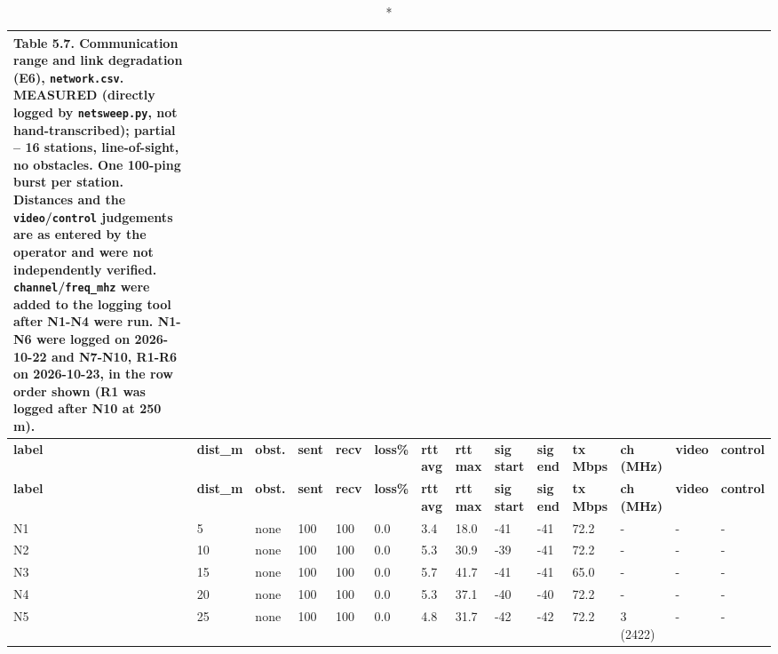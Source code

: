 \begin{center}
\tiny
\begin{longtable}{|l|l|l|l|l|l|l|l|l|l|l|l|l|l|}
\caption*{Table 5.7. Communication range and link degradation (E6), \texttt{network.csv}. MEASURED (directly logged by \texttt{netsweep.py}, not hand-transcribed); partial -- 16 stations, line-of-sight, no obstacles. One 100-ping burst per station. Distances and the \texttt{video}/\texttt{control} judgements are as entered by the operator and were not independently verified. \texttt{channel}/\texttt{freq\_mhz} were added to the logging tool after N1-N4 were run. N1-N6 were logged on 2026-10-22 and N7-N10, R1-R6 on 2026-10-23, in the row order shown (R1 was logged after N10 at 250 m).}
\addcontentsline{lot}{table}{\protect\numberline{5.7}Communication range and link degradation (E6), \texttt{network.csv}. MEASURED (directly logged by \texttt{netsweep.py}, not hand-transcribed); partial -- 16 stations, line-of-sight, no obstacles. One 100-ping burst per station. Distances and the \texttt{video}/\texttt{control} judgements are as entered by the operator and were not independently verified. \texttt{channel}/\texttt{freq\_mhz} were added to the logging tool after N1-N4 were run. N1-N6 were logged on 2026-10-22 and N7-N10, R1-R6 on 2026-10-23, in the row order shown (R1 was logged after N10 at 250 m).}
\\
\hline
\textbf{label} & \textbf{dist\_m} & \textbf{obst.} & \textbf{sent} & \textbf{recv} & \textbf{loss\%} & \textbf{rtt avg} & \textbf{rtt max} & \textbf{sig start} & \textbf{sig end} & \textbf{tx Mbps} & \textbf{ch (MHz)} & \textbf{video} & \textbf{control} \\
\hline
\endfirsthead
\hline
\textbf{label} & \textbf{dist\_m} & \textbf{obst.} & \textbf{sent} & \textbf{recv} & \textbf{loss\%} & \textbf{rtt avg} & \textbf{rtt max} & \textbf{sig start} & \textbf{sig end} & \textbf{tx Mbps} & \textbf{ch (MHz)} & \textbf{video} & \textbf{control} \\
\hline
\endhead
N1 & 5 & none & 100 & 100 & 0.0 & 3.4 & 18.0 & -41 & -41 & 72.2 & - & - & - \\
\hline
N2 & 10 & none & 100 & 100 & 0.0 & 5.3 & 30.9 & -39 & -41 & 72.2 & - & - & - \\
\hline
N3 & 15 & none & 100 & 100 & 0.0 & 5.7 & 41.7 & -41 & -41 & 65.0 & - & - & - \\
\hline
N4 & 20 & none & 100 & 100 & 0.0 & 5.3 & 37.1 & -40 & -40 & 72.2 & - & - & - \\
\hline
N5 & 25 & none & 100 & 100 & 0.0 & 4.8 & 31.7 & -42 & -42 & 72.2 & 3 (2422) & - & - \\

\end{longtable}
\end{center}
